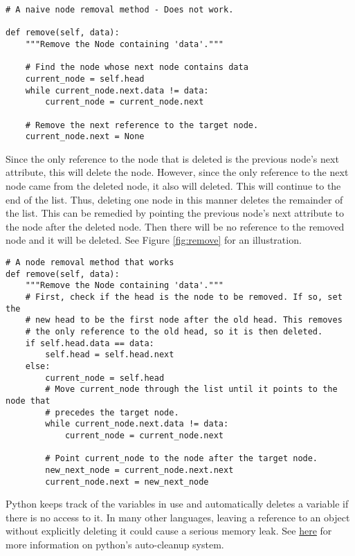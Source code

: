 \begin{lstlisting}
# A naive node removal method - Does not work.

def remove(self, data):
	"""Remove the Node containing 'data'."""

	# Find the node whose next node contains data
	current_node = self.head
	while current_node.next.data != data:
		current_node = current_node.next

	# Remove the next reference to the target node.
	current_node.next = None
\end{lstlisting}

Since the only reference to the node that is deleted is the previous node's next attribute, this will delete the node.
However, since the only reference to the next node came from the deleted node, it also will deleted.
This will continue to the end of the list.
Thus, deleting one node in this manner deletes the remainder of the list.
This can be remedied by pointing the previous node's next attribute to the node after the deleted node.
Then there will be no reference to the removed node and it will be deleted. 
See Figure \ref{fig:remove} for an illustration.

\begin{lstlisting}
# A node removal method that works
def remove(self, data):
	"""Remove the Node containing 'data'."""
	# First, check if the head is the node to be removed. If so, set the
	# new head to be the first node after the old head. This removes
	# the only reference to the old head, so it is then deleted.
	if self.head.data == data:
		self.head = self.head.next
	else:
		current_node = self.head
		# Move current_node through the list until it points to the node that
		# precedes the target node.
		while current_node.next.data != data:
			current_node = current_node.next
	
		# Point current_node to the node after the target node.
		new_next_node = current_node.next.next
		current_node.next = new_next_node
\end{lstlisting}

\begin{warn}

Python keeps track of the variables in use and automatically deletes a variable if there is no access to it.
In many other languages, leaving a reference to an object without explicitly deleting it could cause a serious memory leak.
See \href{https://docs.python.org/2/library/gc.html}{here} for more information on python's auto-cleanup system.
\end{warn}

